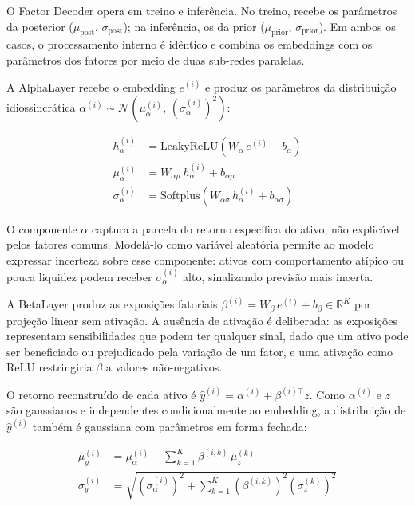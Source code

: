 O Factor Decoder opera em treino e inferência. No treino, recebe os parâmetros da
posterior ($\mu_{\text{post}}$, $\sigma_{\text{post}}$); na inferência, os da prior
($\mu_{\text{prior}}$, $\sigma_{\text{prior}}$). Em ambos os casos, o processamento
interno é idêntico e combina os embeddings com os parâmetros dos fatores por meio de
duas sub-redes paralelas.

A AlphaLayer recebe o embedding $e^{(i)}$ e produz os parâmetros da distribuição
idiossincrática $\alpha^{(i)} \sim \mathcal{N}(\mu_\alpha^{(i)},\,
(\sigma_\alpha^{(i)})^2)$:

\begin{align}
    h_\alpha^{(i)} &= \text{LeakyReLU}\!\left(W_\alpha\, e^{(i)} + b_\alpha\right)
    \label{eq:alpha-hidden} \\
    \mu_\alpha^{(i)} &= W_{\alpha\mu}\, h_\alpha^{(i)} + b_{\alpha\mu}
    \label{eq:alpha-mu} \\
    \sigma_\alpha^{(i)} &= \text{Softplus}\!\left(W_{\alpha\sigma}\, h_\alpha^{(i)} +
    b_{\alpha\sigma}\right)
    \label{eq:alpha-sigma}
\end{align}

O componente $\alpha$ captura a parcela do retorno específica do ativo, não explicável
pelos fatores comuns. Modelá-lo como variável aleatória permite ao modelo expressar
incerteza sobre esse componente: ativos com comportamento atípico ou pouca liquidez
podem receber $\sigma_\alpha^{(i)}$ alto, sinalizando previsão mais incerta.

A BetaLayer produz as exposições fatoriais $\beta^{(i)} = W_\beta\, e^{(i)} + b_\beta
\in \mathbb{R}^K$ por projeção linear sem ativação. A ausência de ativação é
deliberada: as exposições representam sensibilidades que podem ter qualquer sinal, dado
que um ativo pode ser beneficiado ou prejudicado pela variação de um fator, e uma
ativação como ReLU restringiria $\beta$ a valores não-negativos.

O retorno reconstruído de cada ativo é $\hat{y}^{(i)} = \alpha^{(i)} + \beta^{(i)\top}
z$. Como $\alpha^{(i)}$ e $z$ são gaussianos e independentes condicionalmente ao
embedding, a distribuição de $\hat{y}^{(i)}$ também é gaussiana com parâmetros em
forma fechada:

\begin{align}
    \mu_y^{(i)} &= \mu_\alpha^{(i)} + \sum_{k=1}^{K} \beta^{(i,k)}\, \mu_z^{(k)}
    \label{eq:mu-preditivo} \\
    \sigma_y^{(i)} &= \sqrt{\left(\sigma_\alpha^{(i)}\right)^2 + \sum_{k=1}^{K}
    \left(\beta^{(i,k)}\right)^2 \left(\sigma_z^{(k)}\right)^2}
    \label{eq:sigma-preditivo}
\end{align}

